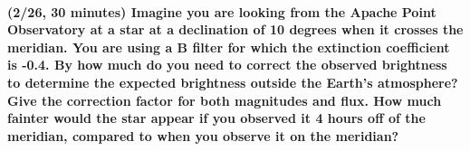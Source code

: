 \documentclass[12pt]{article}
\begin{document}
\paragraph{(2/26, 30 minutes) Imagine you are looking from the Apache
Point Observatory at a star at a declination of 10 degrees when it
crosses the meridian. You are using a B filter for which the
extinction coefficient is -0.4. By how much do you need to correct the
observed brightness to determine the expected brightness outside the
Earth's atmosphere? Give the correction factor for both magnitudes and
flux. How much fainter would the star appear if you observed it 4
hours off of the meridian, compared to when you observe it on the
meridian?}
\end{document}
